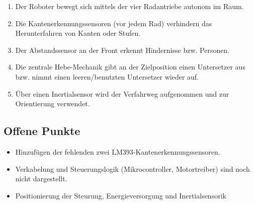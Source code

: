\documentclass[
  a4paper,
  12pt,
  DIV=12,        %
  parskip=half,  %
  headings=small %
]{scrartcl}
\theoremstyle{definition}
\providecommand{\tightlist}{%
  \setlength{\itemsep}{0pt}\setlength{\parskip}{0pt}}
\theoremstyle{definition}
\begin{document}
\begin{enumerate}
\def\labelenumi{\arabic{enumi}.}
\tightlist
\item
  Der Roboter bewegt sich mittels der vier Radantriebe autonom im Raum.
\item
  Die Kantenerkennungssensoren (vor jedem Rad) verhindern das
  Herunterfahren von Kanten oder Stufen.
\item
  Der Abstandssensor an der Front erkennt Hindernisse bzw.
  Personen.
\item
  Die zentrale Hebe-Mechanik gibt an der Zielposition einen Untersetzer
  aus bzw. nimmt einen leeren/benutzten Untersetzer wieder auf.
\item
  Über einen Inertialsensor wird der Verfahrweg aufgenommen und zur
  Orientierung verwendet.
\end{enumerate}

\subsection{Offene Punkte}\label{offene-punkte}

\begin{itemize}
\tightlist
\item
  Hinzufügen der fehlenden zwei LM393-Kantenerkennungssensoren.
\item
  Verkabelung und Steuerungslogik (Mikrocontroller, Motortreiber) sind
  noch nicht dargestellt.
\item
  Positionierung der Steurung, Energieversorgung und Inertialsensorik
\end{itemize}
\end{document}
